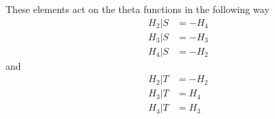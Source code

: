 \begin{lemma}\label{lemma:theta-transform-S-T}\leanok
These elements act on the theta functions in the following way
\begin{align}
    H_2 | S &= -H_4 \label{eqn:H2-transform-S} \\
    H_3 | S &= -H_3 \label{eqn:H3-transform-S} \\
    H_4 | S &= -H_2 \label{eqn:H4-transform-S}
\end{align}
and
\begin{align}
    H_2 | T &= -H_2 \label{eqn:H2-transform-T} \\
    H_3 | T &= H_4 \label{eqn:H3-transform-T} \\
    H_4 | T &= H_3 \label{eqn:H4-transform-T}
\end{align}
\end{lemma}
